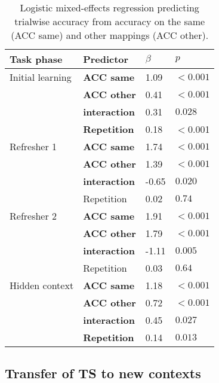\documentclass[10pt, letterpaper]{article}
\begin{document}
\begin{table}[!ht]
\begin{center} 
\caption{Logistic mixed-effects regression predicting trialwise accuracy from accuracy on the same (ACC same) and other mappings (ACC other).} 
\label{table:acc self other} 
\vskip 0.1in
\small{
\begin{tabular}{llll} 
\hline
Task phase          &   Predictor           &   $\beta$ &   $p$ \\
\hline
Initial learning    &   {\bf ACC same}      &   1.09    &   $<0.001$ \\
                    &   {\bf ACC other}     &   0.41    &   $<0.001$ \\
                    &   {\bf interaction}   &   0.31    &   $0.028$  \\
                    &   {\bf Repetition}    &   0.18    &   $<$0.001 \\
Refresher 1         &   {\bf ACC same}      &   1.74    &   $<0.001$ \\
                    &   {\bf ACC other}     &   1.39    &   $<0.001$ \\
                    &   {\bf interaction}   &   -0.65   &   $0.020$  \\
                    &   Repetition          &   0.02    &   $0.74$   \\
Refresher 2         &   {\bf ACC same}      &   1.91    &   $<0.001$ \\
                    &   {\bf ACC other}     &   1.79    &   $<0.001$ \\
                    &   {\bf interaction}   &   -1.11   &   $0.005$  \\
                    &   Repetition          &   0.03    &   $0.64$   \\
Hidden context      &   {\bf ACC same}      &   1.18    &   $<0.001$ \\
                    &   {\bf ACC other}     &   0.72    &   $<0.001$ \\
                    &   {\bf interaction}   &   0.45    &   $0.027$  \\
                    &   {\bf Repetition}    &   0.14    &   $0.013$  \\
\hline
\end{tabular}
}
\end{center} 
\end{table}


\subsection{Transfer of TS to new contexts}
\end{document}

